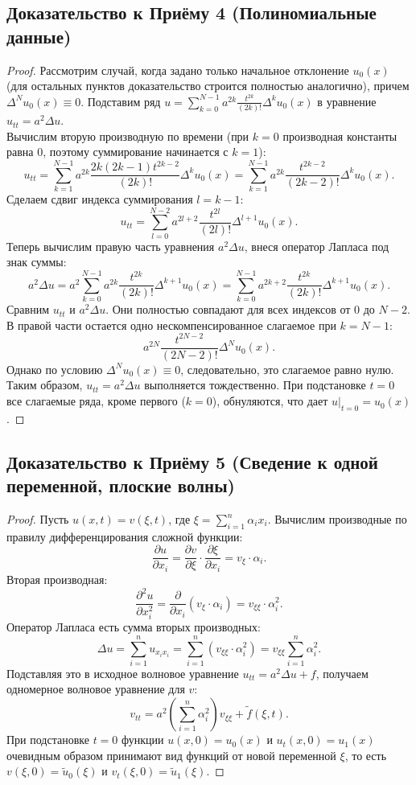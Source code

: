 \documentclass[a4paper,10pt]{article}
\begin{document}
\subsection*{Доказательство к Приёму 4 (Полиномиальные данные)}
\begin{proof}
Рассмотрим случай, когда задано только начальное отклонение $u_0(x)$ (для остальных пунктов доказательство строится полностью аналогично), причем $\Delta^N u_0(x) \equiv 0$. Подставим ряд $u = \sum_{k=0}^{N-1} a^{2k} \frac{t^{2k}}{(2k)!} \Delta^k u_0(x)$ в уравнение $u_{tt} = a^2\Delta u$. \\
Вычислим вторую производную по времени (при $k=0$ производная константы равна 0, поэтому суммирование начинается с $k=1$):
\[
u_{tt} = \sum_{k=1}^{N-1} a^{2k} \frac{2k(2k-1)t^{2k-2}}{(2k)!} \Delta^k u_0(x) = \sum_{k=1}^{N-1} a^{2k} \frac{t^{2k-2}}{(2k-2)!} \Delta^k u_0(x).
\]
Сделаем сдвиг индекса суммирования $l = k - 1$:
\[
u_{tt} = \sum_{l=0}^{N-2} a^{2l+2} \frac{t^{2l}}{(2l)!} \Delta^{l+1} u_0(x).
\]
Теперь вычислим правую часть уравнения $a^2\Delta u$, внеся оператор Лапласа под знак суммы:
\[
a^2\Delta u = a^2 \sum_{k=0}^{N-1} a^{2k} \frac{t^{2k}}{(2k)!} \Delta^{k+1} u_0(x) = \sum_{k=0}^{N-1} a^{2k+2} \frac{t^{2k}}{(2k)!} \Delta^{k+1} u_0(x).
\]
Сравним $u_{tt}$ и $a^2\Delta u$. Они полностью совпадают для всех индексов от $0$ до $N-2$. В правой части остается одно нескомпенсированное слагаемое при $k = N-1$:
\[
a^{2N} \frac{t^{2N-2}}{(2N-2)!} \Delta^N u_0(x).
\]
Однако по условию $\Delta^N u_0(x) \equiv 0$, следовательно, это слагаемое равно нулю. Таким образом, $u_{tt} = a^2\Delta u$ выполняется тождественно. При подстановке $t=0$ все слагаемые ряда, кроме первого ($k=0$), обнуляются, что дает $u|_{t=0} = u_0(x)$.
\end{proof}

\subsection*{Доказательство к Приёму 5 (Сведение к одной переменной, плоские волны)}
\begin{proof}
Пусть $u(x,t) = v(\xi, t)$, где $\xi = \sum_{i=1}^n \alpha_i x_i$. Вычислим производные по правилу дифференцирования сложной функции:
\[
\frac{\partial u}{\partial x_i} = \frac{\partial v}{\partial \xi} \cdot \frac{\partial \xi}{\partial x_i} = v_\xi \cdot \alpha_i.
\]
Вторая производная:
\[
\frac{\partial^2 u}{\partial x_i^2} = \frac{\partial}{\partial x_i} (v_\xi \cdot \alpha_i) = v_{\xi\xi} \cdot \alpha_i^2.
\]
Оператор Лапласа есть сумма вторых производных:
\[
\Delta u = \sum_{i=1}^n u_{x_i x_i} = \sum_{i=1}^n \left( v_{\xi\xi} \cdot \alpha_i^2 \right) = v_{\xi\xi} \sum_{i=1}^n \alpha_i^2.
\]
Подставляя это в исходное волновое уравнение $u_{tt} = a^2\Delta u + f$, получаем одномерное волновое уравнение для $v$:
\[
v_{tt} = a^2 \left(\sum_{i=1}^n \alpha_i^2 \right) v_{\xi\xi} + \tilde{f}(\xi, t).
\]
При подстановке $t=0$ функции $u(x,0) = u_0(x)$ и $u_t(x,0) = u_1(x)$ очевидным образом принимают вид функций от новой переменной $\xi$, то есть $v(\xi, 0) = \tilde{u}_0(\xi)$ и $v_t(\xi, 0) = \tilde{u}_1(\xi)$.
\end{proof}
\end{document}
